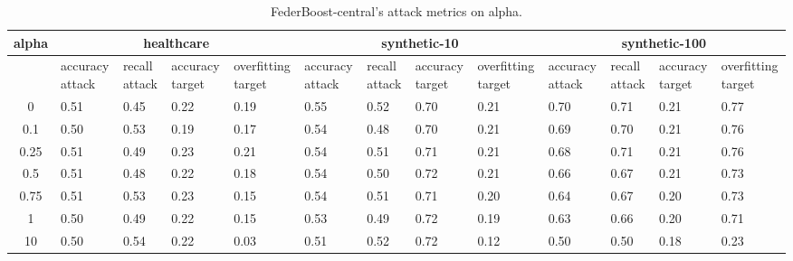 \begin{table*}[]\centering
\begin{tabular}{|c| *{12}{m{1.0cm}|}}
\hline\rowcolor{gray!50}
\cellcolor{gray!80} alpha & \multicolumn{4}{c|}{healthcare} & \multicolumn{4}{c|}{synthetic-10} & \multicolumn{4}{c|}{synthetic-100}\\\hline 
& accuracy attack & recall attack & accuracy target & overfitting target & accuracy attack & recall attack & accuracy target & overfitting target & accuracy attack & recall attack & accuracy target & overfitting target\\\hline
0 & 0.51 & 0.45 & 0.22 & 0.19 & 0.55 & 0.52 & 0.70 & 0.21 & 0.70 & 0.71 & 0.21 & 0.77\\ \hline
0.1 & 0.50 & 0.53 & 0.19 & 0.17 & 0.54 & 0.48 & 0.70 & 0.21 & 0.69 & 0.70 & 0.21 & 0.76\\ \hline
0.25 & 0.51 & 0.49 & 0.23 & 0.21 & 0.54 & 0.51 & 0.71 & 0.21 & 0.68 & 0.71 & 0.21 & 0.76\\ \hline
0.5 & 0.51 & 0.48 & 0.22 & 0.18 & 0.54 & 0.50 & 0.72 & 0.21 & 0.66 & 0.67 & 0.21 & 0.73\\ \hline
0.75 & 0.51 & 0.53 & 0.23 & 0.15 & 0.54 & 0.51 & 0.71 & 0.20 & 0.64 & 0.67 & 0.20 & 0.73\\ \hline
1 & 0.50 & 0.49 & 0.22 & 0.15 & 0.53 & 0.49 & 0.72 & 0.19 & 0.63 & 0.66 & 0.20 & 0.71\\ \hline
10 & 0.50 & 0.54 & 0.22 & 0.03 & 0.51 & 0.52 & 0.72 & 0.12 & 0.50 & 0.50 & 0.18 & 0.23\\ \hline
\end{tabular} 
\caption{FederBoost-central's attack metrics on alpha.}
\label{tab:experiment1_alpha}
\end{table*}
